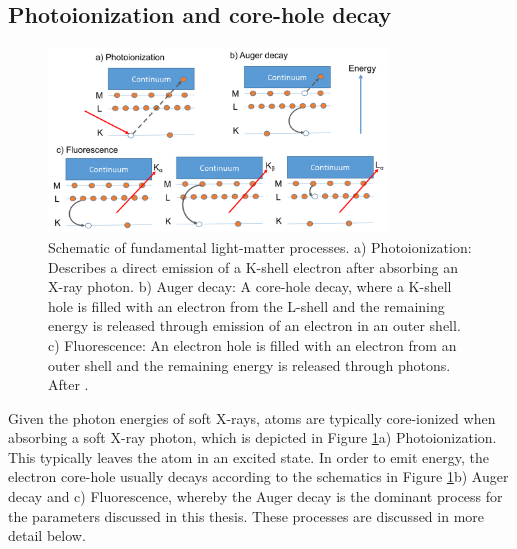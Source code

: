 \subsection{Photoionization and core-hole decay}\label{sec:absorption}
%
\begin{figure}
	\centering
		\includegraphics[width=0.80\textwidth]{images/el-relaxation.png}
	\caption[Schematic illustration of fundamental light-matter processes.]{Schematic of fundamental light-matter processes. a) Photoionization: Describes a direct emission of a K-shell electron after absorbing an X-ray photon. b) Auger decay: A core-hole decay, where a K-shell hole is filled with an electron from the L-shell and the remaining energy is released through emission of an electron in an outer shell. c) Fluorescence: An electron hole is filled with an electron from an outer shell and the remaining energy is released through photons. After \citep{Als-Nielson-2011-JWS}.}
	\label{fig:el-relaxation}
\end{figure}
%
Given the photon energies of soft X-rays, atoms are typically core-ionized when absorbing a soft X-ray photon, which is depicted in Figure \ref{fig:el-relaxation}a) Photoionization. This typically leaves the atom in an excited state. In order to emit energy, the electron core-hole usually decays according to the schematics in Figure \ref{fig:el-relaxation}b) Auger decay and c) Fluorescence, whereby the Auger decay is the dominant process for the parameters discussed in this thesis. These processes are discussed in more detail below.\\[1\baselineskip]
%
%
%
